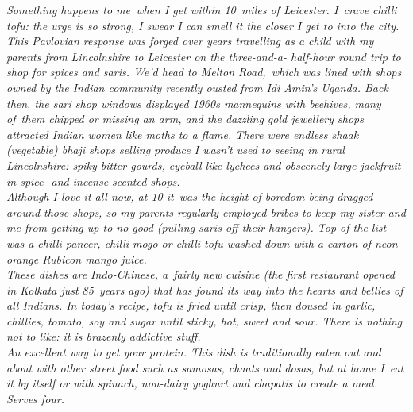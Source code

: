 \documentclass{book}
\begin{document}
\emph{Something happens to me when I get within 10 miles of Leicester. I crave chilli tofu: the urge is so strong, I swear I can smell it the closer I get to into the city.\\ 
This Pavlovian response was forged over years travelling as a child with my parents from Lincolnshire to Leicester on the three-and-a- half-hour round trip to shop for spices and saris. We’d head to Melton Road, which was lined with shops owned by the Indian community recently ousted from Idi Amin’s Uganda. Back then, the sari shop windows displayed 1960s mannequins with beehives, many of them chipped or missing an arm, and the dazzling gold jewellery shops attracted Indian women like moths to a flame. There were endless shaak (vegetable) bhaji shops selling produce I wasn’t used to seeing in rural Lincolnshire: spiky bitter gourds, eyeball-like lychees and obscenely large jackfruit in spice- and incense-scented shops.\\ 
Although I love it all now, at 10 it was the height of boredom being dragged around those shops, so my parents regularly employed bribes to keep my sister and me from getting up to no good (pulling saris off their hangers). Top of the list was a chilli paneer, chilli mogo or chilli tofu washed down with a carton of neon-orange Rubicon mango juice.\\ 
These dishes are Indo-Chinese, a fairly new cuisine (the first restaurant opened in Kolkata just 85 years ago) that has found its way into the hearts and bellies of all Indians. In today’s recipe, tofu is fried until crisp, then doused in garlic, chillies, tomato, soy and sugar until sticky, hot, sweet and sour. There is nothing not to like: it is brazenly addictive stuff.\\ 
An excellent way to get your protein. This dish is traditionally eaten out and about with other street food such as samosas, chaats and dosas, but at home I eat it by itself or with spinach, non-dairy yoghurt and chapatis to create a meal. Serves four.}\\\\ 
\end{document}

